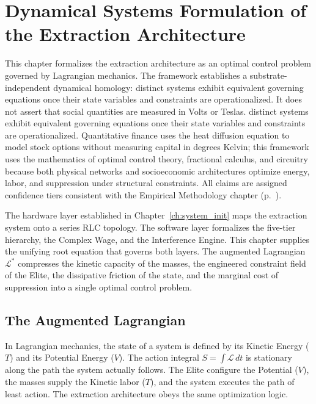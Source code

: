 \chapter{Dynamical Systems Formulation of the Extraction Architecture}
\label{ch:lagrangian}

\begin{definition}
This chapter formalizes the extraction architecture as an optimal control problem governed by Lagrangian mechanics. The framework establishes a substrate-independent dynamical homology: distinct systems exhibit equivalent governing equations once their state variables and constraints are operationalized. It does not assert that social quantities are measured in Volts or Teslas. distinct systems exhibit equivalent governing equations once their state variables and constraints are operationalized. Quantitative finance uses the heat diffusion equation to model stock options without measuring capital in degrees Kelvin; this framework uses the mathematics of optimal control theory, fractional calculus, and circuitry because both physical networks and socioeconomic architectures optimize energy, labor, and suppression under structural constraints. All claims are assigned confidence tiers consistent with the Empirical Methodology chapter (p.~\pageref{ch:empirical_methodology}).
\end{definition}

The hardware layer established in Chapter~\ref{ch:system_init} maps the extraction system onto a series RLC topology. The software layer formalizes the five-tier hierarchy, the Complex Wage, and the Interference Engine. This chapter supplies the unifying root equation that governs both layers. The augmented Lagrangian $\mathcal{L}^*$ compresses the kinetic capacity of the masses, the engineered constraint field of the Elite, the dissipative friction of the state, and the marginal cost of suppression into a single optimal control problem.

\section{The Augmented Lagrangian}

In Lagrangian mechanics, the state of a system is defined by its Kinetic Energy ($T$) and its Potential Energy ($V$). The action integral $S = \int \mathcal{L}\,dt$ is stationary along the path the system actually follows. The Elite configure the Potential ($V$), the masses supply the Kinetic labor ($T$), and the system executes the path of least action. The extraction architecture obeys the same optimization logic.

